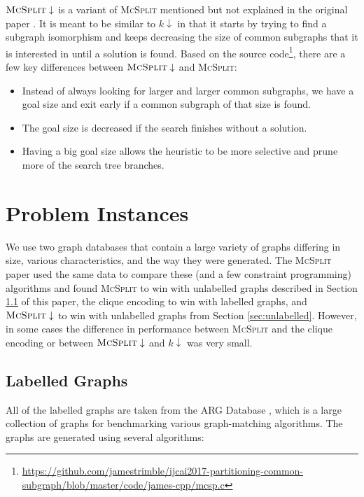\documentclass{l4proj}
\theoremstyle{definition}
\theoremstyle{remark}
\begin{document}
$\textsc{McSplit} \downarrow$ is a variant of \textsc{McSplit} mentioned but not
explained in the original paper \cite{DBLP:conf/ijcai/McCreeshPT17}. It is meant
to be similar to $k\downarrow$ in that it starts by trying to find a subgraph
isomorphism and keeps decreasing the size of common subgraphs that it is
interested in until a solution is found. Based on the source
code\footnote{\url{https://github.com/jamestrimble/ijcai2017-partitioning-common-subgraph/blob/master/code/james-cpp/mcsp.c}},
there are a few key differences between $\textsc{McSplit} \downarrow$ and
\textsc{McSplit}:
\begin{itemize}
\item Instead of always looking for larger and larger common subgraphs, we have
  a goal size and exit early if a common subgraph of that size is found.
\item The goal size is decreased if the search finishes without a solution.
\item Having a big goal size allows the heuristic to be more selective and prune
  more of the search tree branches.
\end{itemize}

\chapter{Problem Instances} \label{chapter:problems}
We use two graph databases that contain a large variety of graphs differing in
size, various characteristics, and the way they were generated. The
\textsc{McSplit} paper \cite{DBLP:conf/ijcai/McCreeshPT17} used the same
data to compare these (and a few constraint programming) algorithms and
found \textsc{McSplit} to win with unlabelled graphs described in Section
\ref{sec:labelled} of this paper, the clique encoding to win with labelled
graphs, and $\textsc{McSplit}\downarrow$ to win with unlabelled graphs from
Section \ref{sec:unlabelled}. However, in some cases the difference in
performance between \textsc{McSplit} and the clique encoding or between
$\textsc{McSplit}\downarrow$ and $k\downarrow$ was very small.

\section{Labelled Graphs} \label{sec:labelled}
All of the labelled graphs are taken from the ARG Database \cite{foggia2001-2,
  DBLP:journals/prl/SantoFSV03}, which is a large collection of graphs for
benchmarking various graph-matching algorithms. The graphs are generated using
several algorithms:
\end{document}
